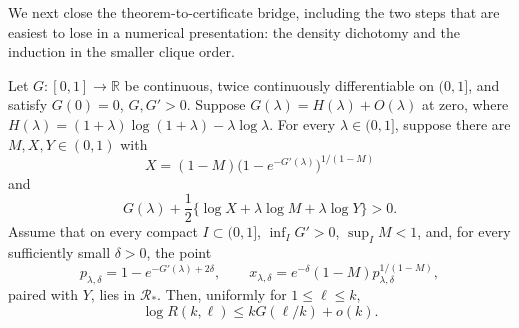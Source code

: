 We next close the theorem-to-certificate bridge, including the two steps that
are easiest to lose in a numerical presentation: the density dichotomy and
the induction in the smaller clique order.

\begin{lemma}\label{lem:finite-net-descent}
Let \(G:[0,1]\to\mathbb R\) be continuous, twice continuously differentiable
on \((0,1]\), and satisfy \(G(0)=0\), \(G,G'>0\).  Suppose
\(G(\lambda)=H(\lambda)+O(\lambda)\) at zero, where
\(H(\lambda)=(1+\lambda)\log(1+\lambda)-\lambda\log\lambda\).
For every \(\lambda\in(0,1]\), suppose there are \(M,X,Y\in(0,1)\) with
\[
 X=(1-M)\bigl(1-e^{-G'(\lambda)}\bigr)^{1/(1-M)}
 \tag{C.4}\label{eq:descent-X}
\]
and
\[
 G(\lambda)+\frac12\{\log X+\lambda\log M+
 \lambda\log Y\}>0.                         \tag{C.5}\label{eq:descent-main}
\]
Assume that on every compact \(I\subset(0,1]\),
\(\inf_I G'>0\), \(\sup_I M<1\), and, for every sufficiently small
\(\delta>0\), the point
\[
 p_{\lambda,\delta}=1-e^{-G'(\lambda)+2\delta},\qquad
 x_{\lambda,\delta}=e^{-\delta}(1-M)
 p_{\lambda,\delta}^{1/(1-M)},              \tag{C.6}
\]
paired with \(Y\), lies in \(\mathcal R_*\).  Then, uniformly for
\(1\le\ell\le k\),
\[
 \log R(k,\ell)\le kG(\ell/k)+o(k).          \tag{C.7}
\]
\end{lemma}

